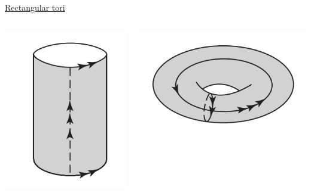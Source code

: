 \documentclass[11pt,aspectratio=169]{beamer}
\begin{document}
\begin{frame}{\underline{Rectangular tori}}
\begin{columns}
\begin{column}{0.2\textwidth}
			\includegraphics[width=\columnwidth]{elements/first ident.PNG}
		\end{column}
		\begin{column}{0.25\textwidth}
			\includegraphics[width=\columnwidth]{elements/second ident.PNG}
		\end{column}
	\end{columns}


	
\end{frame}
\end{document}
